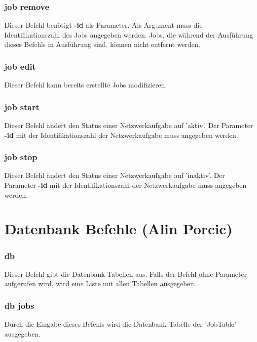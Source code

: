 \documentclass[12pt,a4paper]{report}
\begin{document}
\begin{onehalfspace}
\subsubsection{job remove}

Dieser Befehl benötigt \textbf{-id} als Parameter. Als Argument muss die Identifikationszahl des Jobs angegeben werden. Jobs, die während der Ausführung dieses Befehls in Ausführung sind, können nicht entfernt werden.

\subsubsection{job edit}

Dieser Befehl kann bereits erstellte Jobs modifizieren. 

\subsubsection{job start}

Dieser Befehl ändert den Status einer Netzwerkaufgabe auf 'aktiv'. Der Parameter \textbf{-id} mit der Identifikationszahl der Netzwerkaufgabe muss angegeben werden.

\subsubsection{job stop}

Dieser Befehl ändert den Status einer Netzwerkaufgabe auf 'inaktiv'. Der Parameter \textbf{-id} mit der Identifikationszahl der Netzwerkaufgabe muss angegeben werden.

\section{Datenbank Befehle (Alin Porcic)}

\subsubsection{db}

Dieser Befehl gibt die Datenbank-Tabellen aus. Falls der Befehl ohne Parameter aufgerufen wird, wird eine Liste mit allen Tabellen ausgegeben.

\subsubsection{db jobs}

Durch die Eingabe dieses Befehls wird die Datenbank-Tabelle der 'JobTable' ausgegeben.


\end{onehalfspace}
\end{document}
